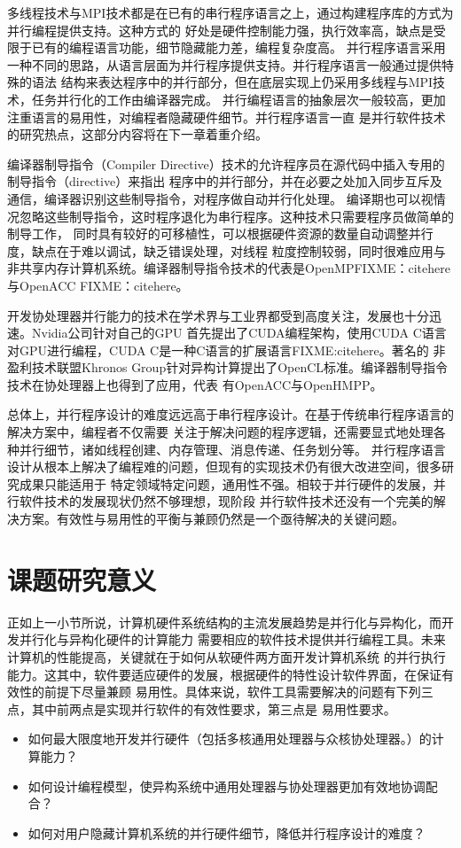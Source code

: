 多线程技术与MPI技术都是在已有的串行程序语言之上，通过构建程序库的方式为并行编程提供支持。这种方式的
好处是硬件控制能力强，执行效率高，缺点是受限于已有的编程语言功能，细节隐藏能力差，编程复杂度高。
并行程序语言采用一种不同的思路，从语言层面为并行程序提供支持。并行程序语言一般通过提供特殊的语法
结构来表达程序中的并行部分，但在底层实现上仍采用多线程与MPI技术，任务并行化的工作由编译器完成。
并行编程语言的抽象层次一般较高，更加注重语言的易用性，对编程者隐藏硬件细节。并行程序语言一直
是并行软件技术的研究热点，这部分内容将在下一章着重介绍。

编译器制导指令（Compiler Directive）技术的允许程序员在源代码中插入专用的制导指令（directive）来指出
程序中的并行部分，并在必要之处加入同步互斥及通信，编译器识别这些制导指令，对程序做自动并行化处理。
编译期也可以视情况忽略这些制导指令，这时程序退化为串行程序。这种技术只需要程序员做简单的制导工作，
同时具有较好的可移植性，可以根据硬件资源的数量自动调整并行度，缺点在于难以调试，缺乏错误处理，对线程
粒度控制较弱，同时很难应用与非共享内存计算机系统。编译器制导指令技术的代表是OpenMPFIXME：citehere与OpenACC
FIXME：citehere。

开发协处理器并行能力的技术在学术界与工业界都受到高度关注，发展也十分迅速。Nvidia公司针对自己的GPU
首先提出了CUDA编程架构，使用CUDA C语言对GPU进行编程，CUDA C是一种C语言的扩展语言FIXME:citehere。著名的
非盈利技术联盟Khronos Group针对异构计算提出了OpenCL标准。编译器制导指令技术在协处理器上也得到了应用，代表
有OpenACC与OpenHMPP。

总体上，并行程序设计的难度远远高于串行程序设计。在基于传统串行程序语言的解决方案中，编程者不仅需要
关注于解决问题的程序逻辑，还需要显式地处理各种并行细节，诸如线程创建、内存管理、消息传递、任务划分等。
并行程序语言设计从根本上解决了编程难的问题，但现有的实现技术仍有很大改进空间，很多研究成果只能适用于
特定领域特定问题，通用性不强。相较于并行硬件的发展，并行软件技术的发展现状仍然不够理想，现阶段
并行软件技术还没有一个完美的解决方案。有效性与易用性的平衡与兼顾仍然是一个亟待解决的关键问题。

\section{课题研究意义}
正如上一小节所说，计算机硬件系统结构的主流发展趋势是并行化与异构化，而开发并行化与异构化硬件的计算能力
需要相应的软件技术提供并行编程工具。未来计算机的性能提高，关键就在于如何从软硬件两方面开发计算机系统
的并行执行能力。这其中，软件要适应硬件的发展，根据硬件的特性设计软件界面，在保证有效性的前提下尽量兼顾
易用性。具体来说，软件工具需要解决的问题有下列三点，其中前两点是实现并行软件的有效性要求，第三点是
易用性要求。
\begin{itemize}
  \item 如何最大限度地开发并行硬件（包括多核通用处理器与众核协处理器。）的计算能力？
  \item 如何设计编程模型，使异构系统中通用处理器与协处理器更加有效地协调配合？
  \item 如何对用户隐藏计算机系统的并行硬件细节，降低并行程序设计的难度？
\end{itemize}

